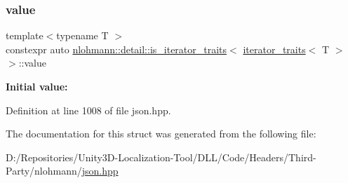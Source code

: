 \subsubsection{\texorpdfstring{value}{value}}
{\footnotesize\ttfamily template$<$typename T $>$ \\
constexpr auto \mbox{\hyperlink{structnlohmann_1_1detail_1_1is__iterator__traits}{nlohmann\+::detail\+::is\+\_\+iterator\+\_\+traits}}$<$ \mbox{\hyperlink{structnlohmann_1_1detail_1_1iterator__traits}{iterator\+\_\+traits}}$<$ T $>$ $>$\+::value\hspace{0.3cm}{\ttfamily [static]}}

{\bfseries Initial value\+:}
\begin{DoxyCode}{0}
\DoxyCodeLine{=}

\end{DoxyCode}


Definition at line 1008 of file json.\+hpp.



The documentation for this struct was generated from the following file\+:\begin{DoxyCompactItemize}
\item 
D\+:/\+Repositories/\+Unity3\+D-\/\+Localization-\/\+Tool/\+D\+L\+L/\+Code/\+Headers/\+Third-\/\+Party/nlohmann/\mbox{\hyperlink{json_8hpp}{json.\+hpp}}\end{DoxyCompactItemize}

